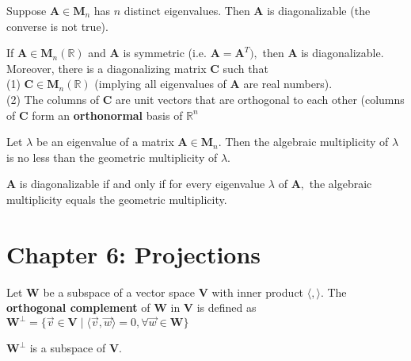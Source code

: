 \documentclass{article}
\begin{document}
\begin{corollary}
Suppose $\boldsymbol{A} \in \boldsymbol{M}_n$ has $n$ distinct eigenvalues. Then $\boldsymbol{A}$ is diagonalizable (the converse is not true).
\end{corollary}

\begin{theorem}
If $\boldsymbol{A} \in \boldsymbol{M}_n(\mathbb{R})$ and $\boldsymbol{A}$ is symmetric (i.e. $\boldsymbol{A} = \boldsymbol{A}^{T}),$ then $\boldsymbol{A}$ is diagonalizable. Moreover, there is a diagonalizing matrix $\boldsymbol{C}$ such that \\
(1) $\boldsymbol{C} \in \boldsymbol{M}_n(\mathbb{R})$ (implying all eigenvalues of $\boldsymbol{A}$ are real numbers). \\
(2) The columns of $\boldsymbol{C}$ are unit vectors that are orthogonal to each other (columns of $\boldsymbol{C}$ form an \textbf{orthonormal} basis of $\mathbb{R}^n$
\end{theorem}

\begin{theorem}
Let $\lambda$ be an eigenvalue of a matrix $\boldsymbol{A} \in \boldsymbol{M}_{n}$. Then the algebraic multiplicity of $\lambda$ is no less than the geometric multiplicity of $\lambda$.
\end{theorem}

\begin{theorem}
$\boldsymbol{A}$ is diagonalizable if and only if for every eigenvalue $\lambda$ of $\boldsymbol{A},$ the algebraic multiplicity equals the geometric multiplicity. 
\end{theorem}

\newpage

\section{Chapter 6: Projections}
\begin{definition}
Let $\boldsymbol{W}$ be a subspace of a vector space $\boldsymbol{V}$ with inner product $\langle , \rangle.$ The \textbf{orthogonal complement} of $\boldsymbol{W}$ in $\boldsymbol{V}$ is defined as $\boldsymbol{W^{\perp}} = \{\vec{v} \in \boldsymbol{V} \mid \langle \vec{v}, \vec{w} \rangle = 0, \forall \vec{w} \in \boldsymbol{W}\}$
\end{definition}

\begin{theorem}
$\boldsymbol{W}^{\perp}$ is a subspace of $\boldsymbol{V}.$ 
\end{theorem}
\end{document}
